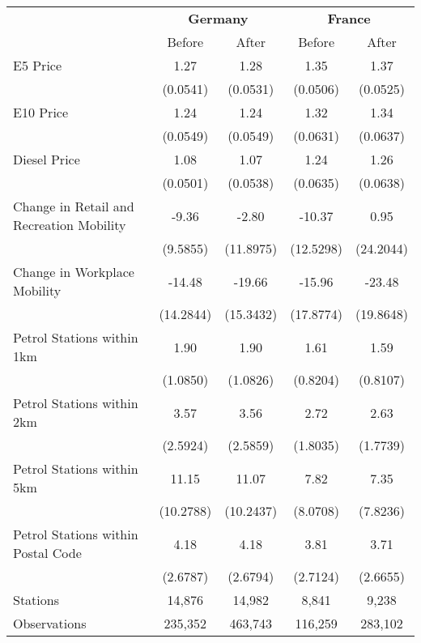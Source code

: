\begin{tabular}{l*{4}{c}}
\toprule
                    &\multicolumn{2}{c}{\textbf{Germany}}&\multicolumn{2}{c}{\textbf{France}}\\\cmidrule(lr){2-3}\cmidrule(lr){4-5}
                    &\multicolumn{1}{c}{Before}&\multicolumn{1}{c}{After}&\multicolumn{1}{c}{Before}&\multicolumn{1}{c}{After}\\
\midrule
E5 Price            &        1.27&        1.28&        1.35&        1.37\\
                    &    (0.0541)&    (0.0531)&    (0.0506)&    (0.0525)\\
E10 Price           &        1.24&        1.24&        1.32&        1.34\\
                    &    (0.0549)&    (0.0549)&    (0.0631)&    (0.0637)\\
Diesel Price        &        1.08&        1.07&        1.24&        1.26\\
                    &    (0.0501)&    (0.0538)&    (0.0635)&    (0.0638)\\
Change in Retail and Recreation Mobility&       -9.36&       -2.80&      -10.37&        0.95\\
                    &    (9.5855)&   (11.8975)&   (12.5298)&   (24.2044)\\
Change in Workplace Mobility&      -14.48&      -19.66&      -15.96&      -23.48\\
                    &   (14.2844)&   (15.3432)&   (17.8774)&   (19.8648)\\
Petrol Stations within 1km&        1.90&        1.90&        1.61&        1.59\\
                    &    (1.0850)&    (1.0826)&    (0.8204)&    (0.8107)\\
Petrol Stations within 2km&        3.57&        3.56&        2.72&        2.63\\
                    &    (2.5924)&    (2.5859)&    (1.8035)&    (1.7739)\\
Petrol Stations within 5km&       11.15&       11.07&        7.82&        7.35\\
                    &   (10.2788)&   (10.2437)&    (8.0708)&    (7.8236)\\
Petrol Stations within Postal Code&        4.18&        4.18&        3.81&        3.71\\
                    &    (2.6787)&    (2.6794)&    (2.7124)&    (2.6655)\\
\midrule
Stations            &      14,876&      14,982&       8,841&       9,238\\
Observations        &     235,352&     463,743&     116,259&     283,102\\
\bottomrule
\end{tabular}
